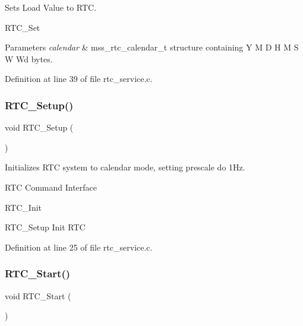 Sets Load Value to R\+TC. 

R\+T\+C\+\_\+\+Set


\begin{DoxyParams}{Parameters}
{\em calendar} & mss\+\_\+rtc\+\_\+calendar\+\_\+t structure containing Y M D H M S W Wd bytes. \\
\hline
\end{DoxyParams}


Definition at line 39 of file rtc\+\_\+service.\+c.

\mbox{\label{group___r_t_c___service_ga6f74820802592d5449a8d5fe14a662a4}} 
\subsubsection{\texorpdfstring{R\+T\+C\+\_\+\+Setup()}{RTC\_Setup()}}
{\footnotesize\ttfamily void R\+T\+C\+\_\+\+Setup (\begin{DoxyParamCaption}{ }\end{DoxyParamCaption})}



Initializes R\+TC system to calendar mode, setting prescale do 1\+Hz. 

R\+TC Command Interface

R\+T\+C\+\_\+\+Init

R\+T\+C\+\_\+\+Setup Init R\+TC 

Definition at line 25 of file rtc\+\_\+service.\+c.

\mbox{\label{group___r_t_c___service_ga66056b41ee0e3a45023c3ce47633e058}} 
\subsubsection{\texorpdfstring{R\+T\+C\+\_\+\+Start()}{RTC\_Start()}}
{\footnotesize\ttfamily void R\+T\+C\+\_\+\+Start (\begin{DoxyParamCaption}{ }\end{DoxyParamCaption})}



